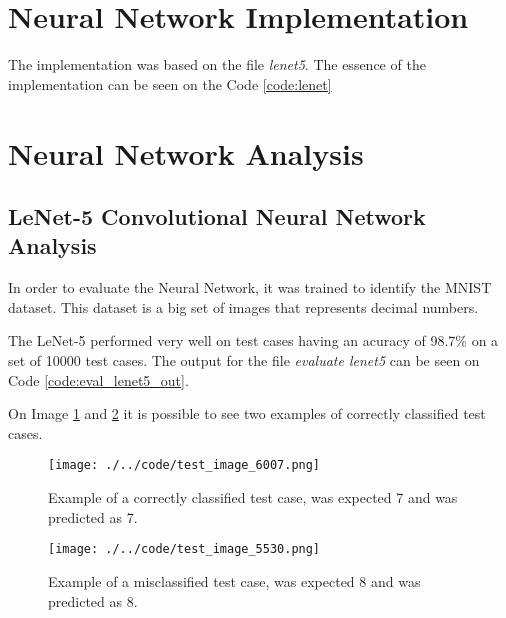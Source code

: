 \documentclass[journal]{IEEEtran}
\begin{document}
\section{Neural Network Implementation}

The implementation was based on the file \textit{lenet5}. The essence of the implementation can be seen on the Code \ref{code:lenet}



\section{Neural Network Analysis}

\subsection{LeNet-5 Convolutional Neural Network Analysis}

In order to evaluate the Neural Network, it was trained to identify the MNIST dataset. This dataset is a big set of images that represents decimal numbers.

The LeNet-5 performed very well on test cases having an acuracy of 98.7\% on a set of 10000 test cases. The output for the file \textit{evaluate lenet5} can be seen on Code \ref{code:eval_lenet5_out}.

On Image \ref{img:classification_one} and \ref{img:classification_two} it is possible to see two examples of correctly classified test cases.

\begin{figure}
  \begin{center}
  \texttt{[image: ./../code/test\_image\_6007.png]}
  \caption{Example of a correctly classified test case, was expected 7 and was predicted as 7.}
  \label{img:classification_one}
  \end{center}
\end{figure}

\begin{figure}
  \begin{center}
  \texttt{[image: ./../code/test\_image\_5530.png]}
  \caption{Example of a misclassified test case, was expected 8 and was predicted as 8.}
  \label{img:classification_two}
  \end{center}
\end{figure}
\end{document}
